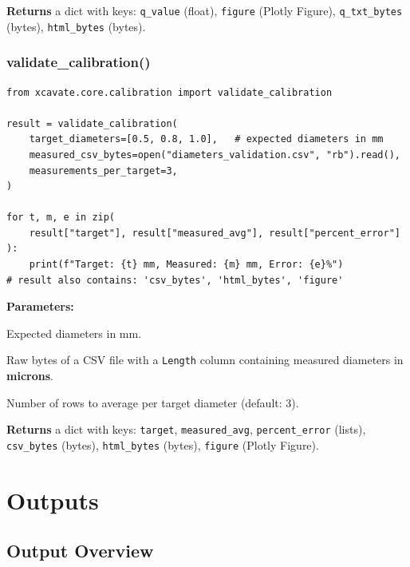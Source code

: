 \documentclass[11pt,letterpaper]{article}
\newcommand{\code}[1]{\texttt{#1}}
\begin{document}
\textbf{Returns} a dict with keys: \code{q\_value} (float), \code{figure}
(Plotly Figure), \code{q\_txt\_bytes} (bytes), \code{html\_bytes} (bytes).

\subsubsection{validate\_calibration()}

\begin{lstlisting}[style=python]
from xcavate.core.calibration import validate_calibration

result = validate_calibration(
    target_diameters=[0.5, 0.8, 1.0],   # expected diameters in mm
    measured_csv_bytes=open("diameters_validation.csv", "rb").read(),
    measurements_per_target=3,
)

for t, m, e in zip(
    result["target"], result["measured_avg"], result["percent_error"]
):
    print(f"Target: {t} mm, Measured: {m} mm, Error: {e}%")
# result also contains: 'csv_bytes', 'html_bytes', 'figure'
\end{lstlisting}

\textbf{Parameters:}
\begin{description}[leftmargin=2cm]
    \item[\code{target\_diameters}] Expected diameters in mm.
    \item[\code{measured\_csv\_bytes}] Raw bytes of a CSV file with a
    \code{Length} column containing measured diameters in \textbf{microns}.
    \item[\code{measurements\_per\_target}] Number of rows to average per
    target diameter (default: 3).
\end{description}

\textbf{Returns} a dict with keys: \code{target}, \code{measured\_avg},
\code{percent\_error} (lists), \code{csv\_bytes} (bytes),
\code{html\_bytes} (bytes), \code{figure} (Plotly Figure).

\section{Outputs}
\label{sec:outputs}

\subsection{Output Overview}
\end{document}
